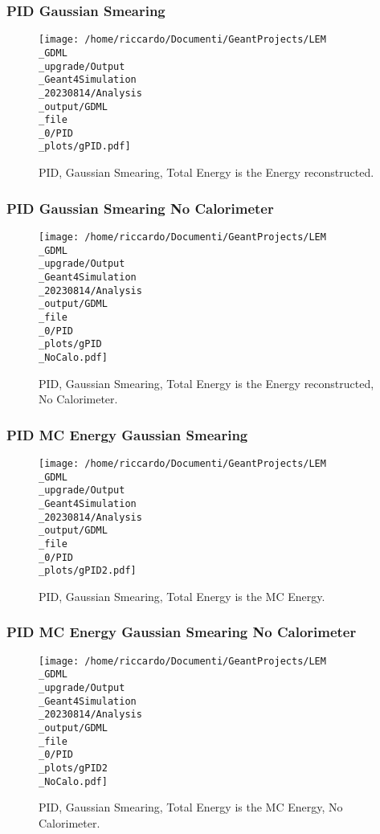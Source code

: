 \documentclass[8pt]{beamer}
\begin{document}
            \begin{frame}
                \frametitle{PID Gaussian Smearing}
            
        \begin{figure}[h]
            \centering
            \texttt{[image: /home/riccardo/Documenti/GeantProjects/LEM\\\_GDML\\\_upgrade/Output\\\_Geant4Simulation\\\_20230814/Analysis\\\_output/GDML\\\_file\\\_0/PID\\\_plots/gPID.pdf]}
            \caption{PID, Gaussian Smearing, Total Energy is the Energy reconstructed.}
        \end{figure}
        
            \end{frame}
            
            \begin{frame}
                \frametitle{PID Gaussian Smearing No Calorimeter}
            
        \begin{figure}[h]
            \centering
            \texttt{[image: /home/riccardo/Documenti/GeantProjects/LEM\\\_GDML\\\_upgrade/Output\\\_Geant4Simulation\\\_20230814/Analysis\\\_output/GDML\\\_file\\\_0/PID\\\_plots/gPID\\\_NoCalo.pdf]}
            \caption{PID, Gaussian Smearing, Total Energy is the Energy reconstructed, No Calorimeter.}
        \end{figure}
        
            \end{frame}
            
            \begin{frame}
                \frametitle{PID MC Energy Gaussian Smearing}
            
        \begin{figure}[h]
            \centering
            \texttt{[image: /home/riccardo/Documenti/GeantProjects/LEM\\\_GDML\\\_upgrade/Output\\\_Geant4Simulation\\\_20230814/Analysis\\\_output/GDML\\\_file\\\_0/PID\\\_plots/gPID2.pdf]}
            \caption{PID, Gaussian Smearing, Total Energy is the MC Energy.}
        \end{figure}
        
            \end{frame}
            
            \begin{frame}
                \frametitle{PID MC Energy Gaussian Smearing No Calorimeter}
            
        \begin{figure}[h]
            \centering
            \texttt{[image: /home/riccardo/Documenti/GeantProjects/LEM\\\_GDML\\\_upgrade/Output\\\_Geant4Simulation\\\_20230814/Analysis\\\_output/GDML\\\_file\\\_0/PID\\\_plots/gPID2\\\_NoCalo.pdf]}
            \caption{PID, Gaussian Smearing, Total Energy is the MC Energy, No Calorimeter.}
        \end{figure}
        
            \end{frame}
            
\end{document}
